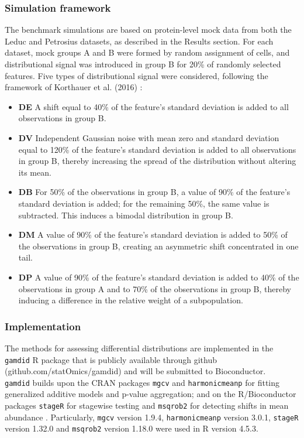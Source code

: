 \subsubsection{Simulation framework}
The benchmark simulations are based on protein-level mock data from both the Leduc and Petrosius datasets, as described in the Results section. For each dataset, mock groups A and B were formed by random assignment of cells, and distributional signal was introduced in group B for 20\% of randomly selected features. Five types of distributional signal were considered, following the framework of Korthauer et al. (2016) \cite{scdd}:
\begin{itemize}
    \item \textbf{DE} A shift equal to 40\% of the feature's standard deviation is added to all observations in group B.
    \item \textbf{DV} Independent Gaussian noise with mean zero and standard deviation equal to 120\% of the feature's standard deviation is added to all observations in group B, thereby increasing the spread of the distribution without altering its mean.
    \item \textbf{DB} For 50\% of the observations in group B, a value of 90\% of the feature's standard deviation is added; for the remaining 50\%, the same value is subtracted. This induces a bimodal distribution in group B.
    \item \textbf{DM} A value of 90\% of the feature's standard deviation is added to 50\% of the observations in group B, creating an asymmetric shift concentrated in one tail.
    \item \textbf{DP} A value of 90\% of the feature's standard deviation is added to 40\% of the observations in group A and to 70\% of the observations in group B, thereby inducing a difference in the relative weight of a subpopulation.
\end{itemize}


\subsubsection{Implementation}
The methods for assessing differential distributions are implemented in the \texttt{gamdid} R package that is publicly available through github (github.com/statOmics/gamdid) and will be submitted to Bioconductor.\\
\texttt{gamdid} builds upon the CRAN packages \texttt{mgcv} \cite{mgcv} and \texttt{harmonicmeanp} \cite{hmp_package} for fitting generalized additive models and p-value aggregation; and on the R/Bioconductor packages \texttt{stageR} \cite{stager} for stagewise testing and \texttt{msqrob2} for detecting shifts in mean abundance \cite{msqrob}. Particularly, \texttt{mgcv} version 1.9.4, \texttt{harmonicmeanp} version 3.0.1, \texttt{stageR} version 1.32.0 and \texttt{msqrob2} version 1.18.0 were used in R version 4.5.3.